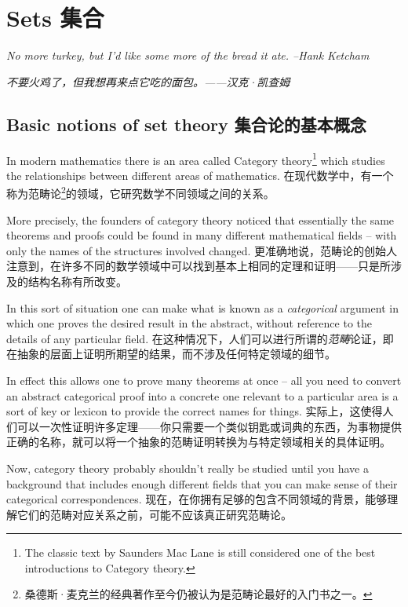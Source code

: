 \chapter{Sets 集合}
\label{ch:sets}

{\em No more turkey, but I'd like some more of the bread it ate.
--Hank Ketcham}

{\em 不要火鸡了，但我想再来点它吃的面包。——汉克·凯查姆}


\section{Basic notions of set theory 集合论的基本概念}
\label{sec:basic_set_notions}

In modern mathematics there is an area called  
Category theory\footnote{The classic text by Saunders Mac Lane \cite{macl} %
is still considered one of the best introductions to Category theory.} 
which studies the 
relationships between different areas of mathematics.
在现代数学中，有一个称为范畴论\footnote{桑德斯·麦克兰的经典著作\cite{macl}至今仍被认为是范畴论最好的入门书之一。}的领域，它研究数学不同领域之间的关系。

More precisely,
the founders of category theory noticed that essentially the same theorems 
and proofs could be found in many different mathematical fields -- with
only the names of the structures involved changed.
更准确地说，范畴论的创始人注意到，在许多不同的数学领域中可以找到基本上相同的定理和证明——只是所涉及的结构名称有所改变。

In this sort of
situation one can make what is known as a \emph{categorical} argument
in which one proves the desired result in the abstract, without reference
to the details of any particular field.
在这种情况下，人们可以进行所谓的\emph{范畴}论证，即在抽象的层面上证明所期望的结果，而不涉及任何特定领域的细节。

In effect this allows one
to prove many theorems at once -- all you need to convert an abstract
categorical proof into a concrete one relevant to a particular area
is a sort of key or lexicon to provide the correct names for things.
实际上，这使得人们可以一次性证明许多定理——你只需要一个类似钥匙或词典的东西，为事物提供正确的名称，就可以将一个抽象的范畴证明转换为与特定领域相关的具体证明。

Now, category theory probably shouldn't really be studied until you 
have a background that includes enough different fields that you can
make sense of their categorical correspondences.
现在，在你拥有足够的包含不同领域的背景，能够理解它们的范畴对应关系之前，可能不应该真正研究范畴论。

